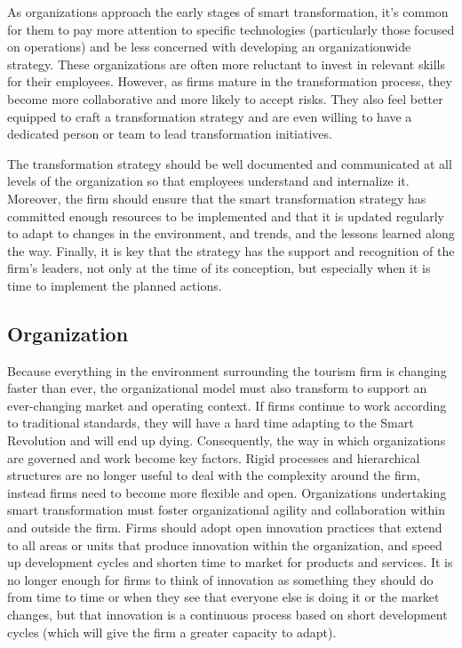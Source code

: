 \documentclass[
  letterpaper,
  DIV=11,
  numbers=noendperiod]{scrreprt}
\begin{document}
As organizations approach the early stages of smart transformation, it's
common for them to pay more attention to specific technologies
(particularly those focused on operations) and be less concerned with
developing an organizationwide strategy. These organizations are often
more reluctant to invest in relevant skills for their employees.
However, as firms mature in the transformation process, they become more
collaborative and more likely to accept risks. They also feel better
equipped to craft a transformation strategy and are even willing to have
a dedicated person or team to lead transformation initiatives.

The transformation strategy should be well documented and communicated
at all levels of the organization so that employees understand and
internalize it. Moreover, the firm should ensure that the smart
transformation strategy has committed enough resources to be implemented
and that it is updated regularly to adapt to changes in the environment,
and trends, and the lessons learned along the way. Finally, it is key
that the strategy has the support and recognition of the firm's leaders,
not only at the time of its conception, but especially when it is time
to implement the planned actions.

\hypertarget{organization-1}{%
\subsection{Organization}\label{organization-1}}

Because everything in the environment surrounding the tourism firm is
changing faster than ever, the organizational model must also transform
to support an ever-changing market and operating context. If firms
continue to work according to traditional standards, they will have a
hard time adapting to the Smart Revolution and will end up dying.
Consequently, the way in which organizations are governed and work
become key factors. Rigid processes and hierarchical structures are no
longer useful to deal with the complexity around the firm, instead firms
need to become more flexible and open. Organizations undertaking smart
transformation must foster organizational agility and collaboration
within and outside the firm. Firms should adopt open innovation
practices that extend to all areas or units that produce innovation
within the organization, and speed up development cycles and shorten
time to market for products and services. It is no longer enough for
firms to think of innovation as something they should do from time to
time or when they see that everyone else is doing it or the market
changes, but that innovation is a continuous process based on short
development cycles (which will give the firm a greater capacity to
adapt).
\end{document}
